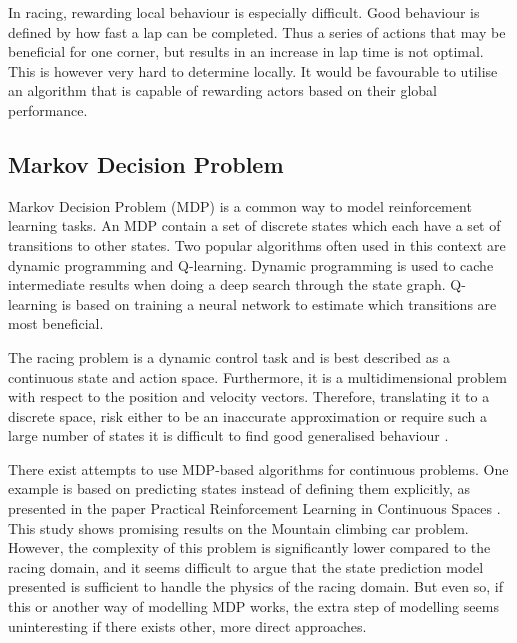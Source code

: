 In racing, rewarding local behaviour is especially difficult. Good behaviour is defined by how fast a lap can be completed. Thus a series of actions that may be beneficial for one corner, but results in an increase in lap time is not optimal. This is however very hard to determine locally. It would be favourable to utilise an algorithm that is capable of rewarding actors based on their global performance.

\subsection{Markov Decision Problem}
Markov Decision Problem (MDP) is a common way to model reinforcement learning tasks. An MDP contain a set of discrete states which each have a set of transitions to other states. Two popular algorithms often used in this context are dynamic programming and Q-learning. Dynamic programming is used to cache intermediate results when doing a deep search through the state graph. Q-learning is based on training a neural network to estimate which transitions are most beneficial. 

The racing problem is a dynamic control task and is best described as a continuous state and action space. Furthermore, it is a multidimensional problem with respect to the position and velocity vectors. Therefore, translating it to a discrete space, risk either to be an inaccurate approximation or require such a large number of states it is difficult to find good generalised behaviour \cite{smart}. 

There exist attempts to use MDP-based algorithms for continuous problems. One example is based on predicting states instead of defining them explicitly, as presented in the paper Practical Reinforcement Learning in Continuous Spaces \cite{smart}. This study shows promising results on the Mountain climbing car problem. However, the complexity of this problem is significantly lower compared to the racing domain, and it seems difficult to argue that the state prediction model presented is sufficient to handle the physics of the racing domain. But even so, if this or another way of modelling MDP works, the extra step of modelling seems uninteresting if there exists other, more direct approaches.



